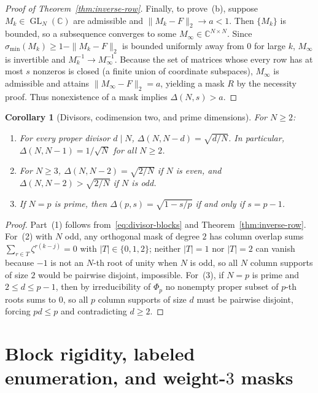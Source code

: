 \documentclass[11pt,reqno]{amsart}
\numberwithin{equation}{section}
\newtheorem{corollary}[theorem]{Corollary}
\theoremstyle{definition}
\theoremstyle{remark}
\newcommand{\C}{\mathbb{C}}
\newcommand{\GL}{\operatorname{GL}}
\begin{document}
\begin{proof}[Proof of Theorem~\ref{thm:inverse-row}]
Finally, to prove~(b), suppose $M_k\in\GL_N(\C)$ are admissible and $\|M_k-F\|_2\to a<1$. Then $\{M_k\}$ is bounded, so a subsequence converges to some $M_\infty\in\C^{N\times N}$. Since $\sigma_{\min}(M_k)\ge 1-\|M_k-F\|_2$ is bounded uniformly away from $0$ for large $k$, $M_\infty$ is invertible and $M_k^{-1}\to M_\infty^{-1}$. Because the set of matrices whose every row has at most $s$ nonzeros is closed (a finite union of coordinate subspaces), $M_\infty$ is admissible and attains $\|M_\infty-F\|_2=a$, yielding a mask $R$ by the necessity proof. Thus nonexistence of a mask implies $\Delta(N,s)>a$.
\end{proof}

\begin{corollary}[Divisors, codimension two, and prime dimensions]
\label{cor:easy-cases}
For $N\ge 2$:
\begin{enumerate}[label=(\arabic*),leftmargin=2em]
\item For every proper divisor $d\mid N$, $\Delta(N,N-d)=\sqrt{d/N}$. In particular, $\Delta(N,N-1)=1/\sqrt{N}$ for all $N\ge 2$.
\item For $N\ge 3$, $\Delta(N,N-2)=\sqrt{2/N}$ if $N$ is even, and $\Delta(N,N-2)>\sqrt{2/N}$ if $N$ is odd.
\item If $N=p$ is prime, then $\Delta(p,s)=\sqrt{1-s/p}$ if and only if $s=p-1$.
\end{enumerate}
\end{corollary}

\begin{proof}
Part~(1) follows from~\eqref{eq:divisor-blocks} and Theorem~\ref{thm:inverse-row}. For~(2) with $N$ odd, any orthogonal mask of degree $2$ has column overlap sums $\sum_{r\in T}\zeta^{r(k-j)}=0$ with $|T|\in\{0,1,2\}$; neither $|T|=1$ nor $|T|=2$ can vanish because $-1$ is not an $N$-th root of unity when $N$ is odd, so all $N$ column supports of size $2$ would be pairwise disjoint, impossible. For~(3), if $N=p$ is prime and $2\le d\le p-1$, then by irreducibility of $\Phi_p$ no nonempty proper subset of $p$-th roots sums to $0$, so all $p$ column supports of size $d$ must be pairwise disjoint, forcing $pd\le p$ and contradicting $d\ge 2$.
\end{proof}

\section{Block rigidity, labeled enumeration, and weight-$3$ masks}
\label{sec:rigidity}
\end{document}
